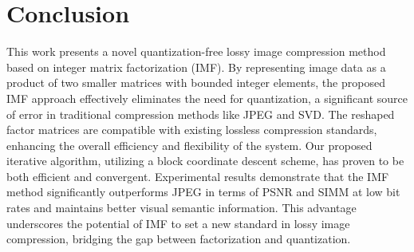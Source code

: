 \section{Conclusion} \label{sec:conclusion}

This work presents a novel quantization-free lossy image compression method based on integer matrix factorization (IMF). By representing image data as a product of two smaller matrices with bounded integer elements, the proposed IMF approach effectively eliminates the need for quantization, a significant source of error in traditional compression methods like JPEG and SVD. The reshaped factor matrices are compatible with existing lossless compression standards, enhancing the overall efficiency and flexibility of the system. Our proposed iterative algorithm, utilizing a block coordinate descent scheme, has proven to be both efficient and convergent. Experimental results demonstrate that the IMF method significantly outperforms JPEG in terms of PSNR and SIMM at low bit rates and maintains better visual semantic information. This advantage underscores the potential of IMF to set a new standard in lossy image compression, bridging the gap between factorization and quantization.

